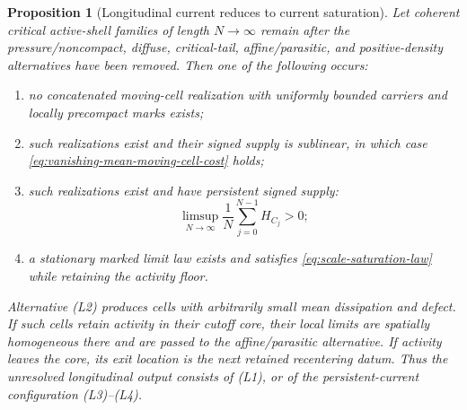 \documentclass[11pt]{amsart}
\numberwithin{equation}{section}
\theoremstyle{plain}
\newtheorem{proposition}[proposition]{Proposition}
\theoremstyle{definition}
\theoremstyle{remark}
\begin{document}
\begin{proposition}[Longitudinal current reduces to current saturation]
\label{prop:longitudinal-current-to-saturation}
Let coherent critical active-shell families of length \(N\to\infty\) remain
after the pressure/noncompact, diffuse, critical-tail, affine/parasitic, and
positive-density alternatives have been removed.  Then one of the following
occurs:
\begin{enumerate}[label=\textup{(L\arabic*)}]
 \item no concatenated moving-cell realization with uniformly bounded
 carriers and locally precompact marks exists;
 \item such realizations exist and their signed supply is sublinear, in which
 case \eqref{eq:vanishing-mean-moving-cell-cost} holds;
 \item such realizations exist and have persistent signed supply:
 \begin{equation}\label{eq:persistent-moving-cell-supply}
  \limsup_{N\to\infty}\frac1N\sum_{j=0}^{N-1}H_{C_j}>0;
 \end{equation}
 \item a stationary marked limit law exists and satisfies
 \eqref{eq:scale-saturation-law} while retaining the activity floor.
\end{enumerate}
Alternative \textup{(L2)} produces cells with arbitrarily small mean
dissipation and defect.  If such cells retain activity in their cutoff core,
their local limits are spatially homogeneous there and are passed to the
affine/parasitic alternative.  If activity leaves the core, its exit location
is the next retained recentering datum.  Thus the unresolved longitudinal
output consists of \textup{(L1)}, or of the persistent-current configuration
\textup{(L3)}--\textup{(L4)}.
\end{proposition}
\end{document}
